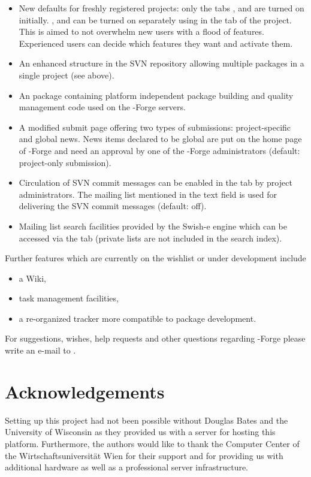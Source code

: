\begin{itemize}
\item New defaults for freshly registered projects: only the tabs
  ,  and  are turned on
  initially. ,  and 
  can be turned on separately using  in
  the  tab of the project. This is aimed to not overwhelm
  new users with a flood of features. Experienced users can decide
  which features they want and activate them.
\item An enhanced structure in the SVN repository allowing multiple
  packages in a single project (see above).
\item An \R{} package \citep[,
  see][]{forge:theussl:2008} containing platform independent package
  building and quality management code used on the \R{}-Forge servers.
\item A modified  submit page offering two types of
  submissions: project-specific and global news. News items
  declared to be global are put on the home page of \R{}-Forge and
  need an approval by one of the \R{}-Forge administrators (default:
  project-only submission).
\item Circulation of SVN commit messages can be enabled in the
   tab by project administrators. The mailing list mentioned in
  the text field is used for delivering the SVN commit messages
  (default: off). 
\item Mailing list search facilities provided by the Swish-e engine
  which can be accessed via the  tab (private lists
  are not included in the search index).

\end{itemize}

Further features which are currently on the wishlist or under
development include 

\begin{itemize}
\item a Wiki,
\item task management facilities,
\item a re-organized tracker more compatible to \R{} package development. 
\end{itemize}

For suggestions, wishes, help requests and other questions regarding
\R{}-Forge please write an e-mail to .

\section{Acknowledgements}

Setting up this project had not been possible without Douglas
Bates and the University of Wisconsin as they provided us with a
server for hosting this platform. Furthermore, 
the authors would like to thank the Computer Center 
of the Wirtschaftsuniversit\"at Wien for
their support and for providing us with additional hardware as well as a
professional server infrastructure.


